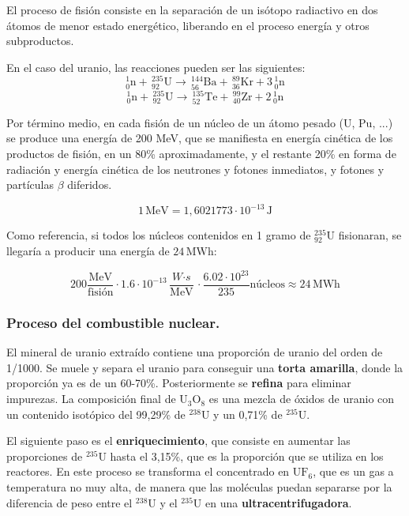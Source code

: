 			
			El proceso de fisión consiste en la separación de un isótopo radiactivo en dos átomos de menor estado energético, liberando en el proceso energía y otros subproductos.
			
			
			En el caso del uranio, las reacciones pueden ser las siguientes:
			\[^1_0\text{n} +\, ^{235}_{92}\text{U} \longrightarrow\,^{144}_{56}\text{Ba} +\, ^{89}_{36}\text{Kr} + 3\,^1_0\text{n}\]
			\[^1_0\text{n} +\, ^{235}_{92}\text{U} \longrightarrow\,^{135}_{52}\text{Te} +\, ^{99}_{40}\text{Zr} + 2\,^1_0\text{n}\]
			
			
			Por término medio, en cada fisión de un núcleo de un átomo pesado (U, Pu, ...) se
			produce una energía de 200 MeV, que se manifiesta en energía cinética de los productos
			de fisión, en un 80\% aproximadamente, y el restante 20\% en forma de radiación y
			energía cinética de los neutrones y fotones inmediatos, y fotones y partículas $\beta$ diferidos.
			
			\[1\,\text{MeV} = 1,6021773\cdot 10^{-13}\,\text{J}\]
			
			
			Como referencia, si todos los núcleos contenidos en 1 gramo de $^{235}_{92}\text{U}$ fisionaran, se llegaría a producir una energía de $24\,\text{MWh}$:
			
			\[200\dfrac{\text{MeV}}{\text{fisión}}\cdot 1.6\cdot 10^{-13}\dfrac{\textit{W}\cdot \textit{s}}{\text{MeV}}\cdot \dfrac{6.02\cdot 10^{23}}{235} \text{núcleos} \approx 24\,\text{MWh}\]
			
		\subsubsection{Proceso del combustible nuclear.}
			El mineral de uranio extraído contiene una proporción de uranio del orden de 1/1000. Se muele y separa el uranio para conseguir una \textbf{torta amarilla}, donde la proporción ya es de un 60-70\%. Posteriormente se \textbf{refina} para eliminar impurezas. La composición final de $\text{U}_3\text{O}_8$ es una mezcla de óxidos de uranio con un contenido isotópico del 99,29\% de $^{238}$U y un 0,71\% de $^{235}$U.
			
			
			El siguiente paso es el \textbf{enriquecimiento}, que consiste en aumentar las proporciones de $^{235}$U hasta el 3,15\%, que es la proporción que se utiliza en los reactores. En este proceso se transforma el concentrado en $\text{UF}_6$, que es un gas a temperatura no muy alta, de manera que las moléculas puedan separarse por la diferencia de peso entre el $^{238}$U y el $^{235}$U en una \textbf{ultracentrifugadora}.
			
